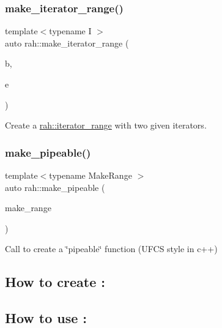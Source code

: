 \subsubsection{\texorpdfstring{make\_iterator\_range()}{make\_iterator\_range()}}
{\footnotesize\ttfamily template$<$typename I $>$ \\
auto rah\+::make\+\_\+iterator\+\_\+range (\begin{DoxyParamCaption}\item[{I}]{b,  }\item[{I}]{e }\end{DoxyParamCaption})}



Create a \mbox{\hyperlink{structrah_1_1iterator__range}{rah\+::iterator\+\_\+range}} with two given iterators. 

\mbox{\label{namespacerah_a9beb2a94a054fd0caefd5a20b1c0f0d9}} 
\subsubsection{\texorpdfstring{make\_pipeable()}{make\_pipeable()}}
{\footnotesize\ttfamily template$<$typename Make\+Range $>$ \\
auto rah\+::make\+\_\+pipeable (\begin{DoxyParamCaption}\item[{Make\+Range \&\&}]{make\+\_\+range }\end{DoxyParamCaption})}



Call to create a \char`\"{}pipeable\char`\"{} function (U\+F\+CS style in c++) 

\hypertarget{namespacerah_create_pipeable}{}\subsection{How to create \+:}\label{namespacerah_create_pipeable}

\begin{DoxyCodeInclude}{0}
\DoxyCodeLine{\{}
\DoxyCodeLine{\}}
\end{DoxyCodeInclude}
\hypertarget{namespacerah_use_pipeable}{}\subsection{How to use \+:}\label{namespacerah_use_pipeable}

